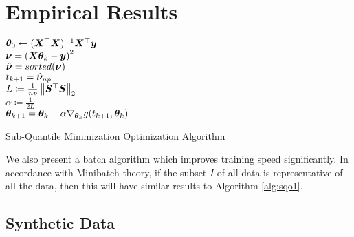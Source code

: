 \documentclass{article} %
\newcommand{\norm}[1]{\left\lVert#1\right\rVert}
\begin{document}
	\section{Empirical Results}\label{sec:numerical-experiments}
	
	\begin{algorithm}[H]
		\DontPrintSemicolon
		
		${\bm{\theta}}_0 \gets ({\bm{X}}^\top{\bm{X}})^{-1}{\bm{X}}^\top{\bm{y}}$\\
		{
			$\displaystyle {\bm{\nu}} = \left({\bm{X}}{\bm{\theta}}_k - {\bm{y}}\right)^2$\\
			$\hat{{\bm{\nu}}} = sorted({\bm{\nu}})$\\
			$\displaystyle t_{k+1} = \hat{{\bm{\nu}}}_{np}$\\
			$L \coloneqq \frac{1}{np}\norm{\mS^\top\mS}_2$\\
			$\alpha \coloneqq \frac{1}{2L}$\\
			$\displaystyle {\bm{\theta}}_{k+1} = {\bm{\theta}}_k - \alpha \nabla_{{\bm{\theta}}_k}g(t_{k+1},{\bm{\theta}}_k)$
		}
		\caption{Sub-Quantile Minimization Optimization Algorithm}
		\label{alg:sqo1}
	\end{algorithm}

	We also present a batch algorithm which improves training speed significantly. In accordance with Minibatch theory, if the subset $I$ of all data is representative of all the data, then this will have similar results to Algorithm \ref{alg:sqo1}.

	\subsection{Synthetic Data}
	
\end{document}
